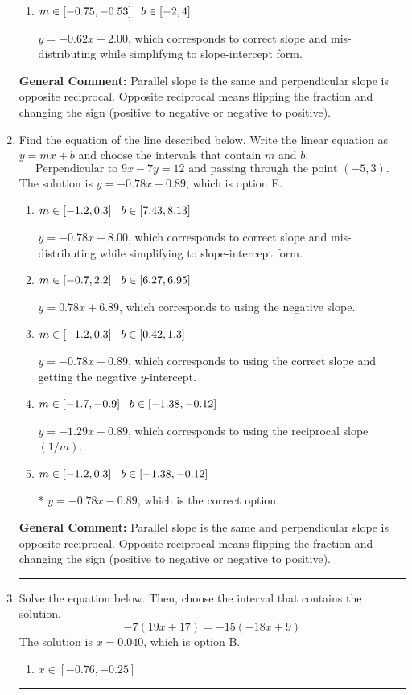 \documentclass{extbook}[14pt]
\newcommand{\litem}[1]{\item #1

\rule{\textwidth}{0.4pt}}
\begin{document}
\begin{enumerate}
{\begin{enumerate}[label=\Alph*.]
* $y = -0.62x + 11.75$, which is the correct option.
\item \( m \in [-0.75, -0.53] \hspace*{3mm} b \in [-2, 4] \)

 $y = -0.62x + 2.00$, which corresponds to correct slope and mis-distributing while simplifying to slope-intercept form.
\end{enumerate}

\textbf{General Comment:} Parallel slope is the same and perpendicular slope is opposite reciprocal. Opposite reciprocal means flipping the fraction and changing the sign (positive to negative or negative to positive).
}
\litem{
Find the equation of the line described below. Write the linear equation as $ y=mx+b $ and choose the intervals that contain $m$ and $b$.
\[ \text{Perpendicular to } 9 x - 7 y = 12 \text{ and passing through the point } (-5, 3). \]
The solution is \( y = -0.78x - 0.89 \), which is option E.\begin{enumerate}[label=\Alph*.]
\item \( m \in [-1.2, 0.3] \hspace*{3mm} b \in [7.43, 8.13] \)

 $y = -0.78x + 8.00$, which corresponds to correct slope and mis-distributing while simplifying to slope-intercept form.
\item \( m \in [-0.7, 2.2] \hspace*{3mm} b \in [6.27, 6.95] \)

 $y = 0.78x + 6.89$, which corresponds to using the negative slope.
\item \( m \in [-1.2, 0.3] \hspace*{3mm} b \in [0.42, 1.3] \)

 $y = -0.78x + 0.89$, which corresponds to using the correct slope and getting the negative $y$-intercept.
\item \( m \in [-1.7, -0.9] \hspace*{3mm} b \in [-1.38, -0.12] \)

 $y = -1.29x - 0.89$, which corresponds to using the reciprocal slope $(1/m)$.
\item \( m \in [-1.2, 0.3] \hspace*{3mm} b \in [-1.38, -0.12] \)

* $y = -0.78x - 0.89$, which is the correct option.
\end{enumerate}

\textbf{General Comment:} Parallel slope is the same and perpendicular slope is opposite reciprocal. Opposite reciprocal means flipping the fraction and changing the sign (positive to negative or negative to positive).
}
\litem{
Solve the equation below. Then, choose the interval that contains the solution.
\[ -7(19x + 17) = -15(-18x + 9) \]
The solution is \( x = 0.040 \), which is option B.\begin{enumerate}[label=\Alph*.]
\item \( x \in [-0.76, -0.25] \)


\end{enumerate}}
\end{enumerate}
\end{document}
